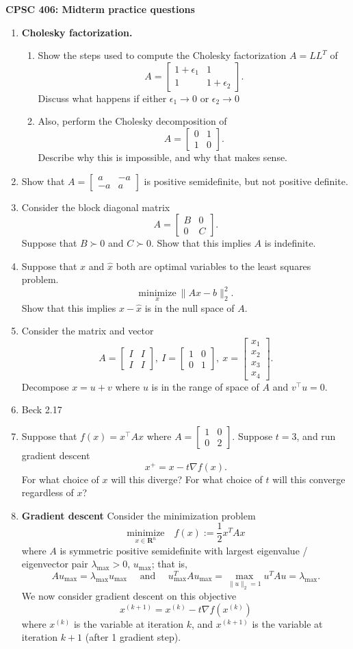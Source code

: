 \documentclass{article}
\newcommand{\mypagebreak}{\begin{center}
		\noindent\makebox[\linewidth]{\rule{7.5in}{1pt}}
	\end{center}}
\newcommand{\minimize}[1]{\underset{#1}{\mathrm{minimize}}}
\renewcommand{\Re}{\mathbf R}
\newcommand{\bmat}{\left[\begin{matrix}}
\newcommand{\emat}{\end{matrix}\right]}
\begin{document}
{\Large\textbf{CPSC 406: Midterm practice questions \hfill }}


\mypagebreak



\begin{enumerate}
	\item \textbf{Cholesky factorization.} 
	
	\begin{enumerate}
		\item Show the steps used to compute the Cholesky factorization $A = LL^T$ of 
		\[
		A = \bmat 1 + \epsilon_1 & 1 \\ 1 & 1 + \epsilon_2 \emat.
		\]
		Discuss what happens if either $\epsilon_1\to 0$ or $\epsilon_2 \to 0$
		
		\item Also, perform the Cholesky decomposition of 
		\[
		A = \bmat 0 & 1 \\ 1 &  0 \emat.
		\]
		Describe why this is impossible, and why that makes sense. 
	\end{enumerate}
	\item Show that $A = \bmat a& -a \\ -a &a\emat$ is positive semidefinite, but not positive definite.
	\item Consider the block diagonal matrix 
			$$A = \bmat B&0\\0&C\emat.$$
			Suppose that $B\succ	 0$ and $C\succ 0$. Show that this implies $A$ is indefinite.
	\item Suppose that $x$ and $\hat{x}$ both are optimal variables to the least squares problem.
			$$\minimize{x}\ \|Ax-b\|_2^2.$$
			Show that this implies $x-\hat{x}$ is in the null space of $A$.
	\item Consider the matrix and vector 
			$$A = \bmat I&I\\I&I\emat, \ I =\bmat 1&0\\0&1\emat,\ x = \bmat x_1\\x_2\\x_3\\x_4\emat.$$
			Decompose $x = u+v$ where $u$ is in the range of space of $A$ and $v^\intercal u = 0$.
	\item Beck 2.17
	\item Suppose that $f(x) = x^\intercal Ax$ where $A = \bmat 1&0\\0&2 \emat$. Suppose $t=3$, and run gradient descent
			$$x^+ = x - t\nabla f(x).$$
			For what choice of $x$ will this diverge? For what choice of $t$ will this converge regardless of $x$?			
	\item \textbf{Gradient descent} Consider the minimization problem
	\[
	\minimize{x\in \Re^n} \quad f(x) := \frac{1}{2} x^TAx 
	\]
	where $A$ is symmetric positive semidefinite with largest eigenvalue / eigenvector pair $\lambda_{\max}>0$, $u_{\max}$; that is, 
	\[
	Au_{\max} = \lambda_{\max} u_{\max} \quad \text{ and } \quad u_{\max}^TAu_{\max} = \max_{\|u\|_2=1} u^TAu = \lambda_{\max}.
	\]
	We now consider gradient descent on this objective
	\[
	x^{(k+1)} = x^{(k)} - t \nabla f(x^{(k)})
	\]
where $x^{(k)}$ is the variable at iteration $k$, and $x^{(k+1)}$ is the variable at iteration $k+1$ (after 1 gradient step).
	

\end{enumerate}
\end{document}
